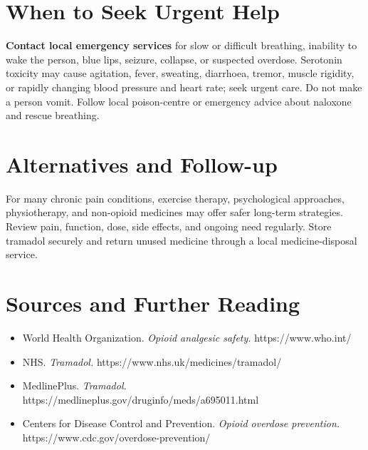 \section*{When to Seek Urgent Help}
\textbf{Contact local emergency services} for slow or difficult breathing, inability to wake the person, blue lips, seizure, collapse, or suspected overdose. Serotonin toxicity may cause agitation, fever, sweating, diarrhoea, tremor, muscle rigidity, or rapidly changing blood pressure and heart rate; seek urgent care. Do not make a person vomit. Follow local poison-centre or emergency advice about naloxone and rescue breathing.

\section*{Alternatives and Follow-up}
For many chronic pain conditions, exercise therapy, psychological approaches, physiotherapy, and non-opioid medicines may offer safer long-term strategies. Review pain, function, dose, side effects, and ongoing need regularly. Store tramadol securely and return unused medicine through a local medicine-disposal service.

\section*{Sources and Further Reading}
\begin{itemize}
    \item World Health Organization. \textit{Opioid analgesic safety.} https://www.who.int/
    \item NHS. \textit{Tramadol.} https://www.nhs.uk/medicines/tramadol/
    \item MedlinePlus. \textit{Tramadol.} https://medlineplus.gov/druginfo/meds/a695011.html
    \item Centers for Disease Control and Prevention. \textit{Opioid overdose prevention.} https://www.cdc.gov/overdose-prevention/
\end{itemize}
